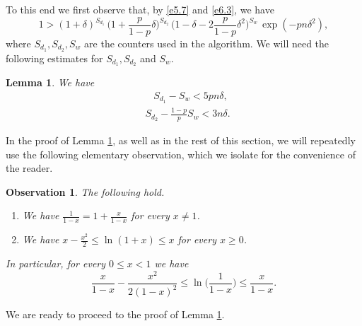 \documentclass[10pt]{amsart}
\newtheorem{lem}[thm]{Lemma}
\newtheorem{observation}[thm]{Observation}
\theoremstyle{remark}
\newcommand{\meg}{\geqslant}
\newcommand{\mik}{\leqslant}
\begin{document}
To this end we first observe that, by \eqref{e5.7} and \eqref{e6.3}, we have
\begin{equation} \label{e6.4}
1 >(1+\delta)^{S_{d_1}}\, \Big(1+\frac{p}{1-p}\delta\Big)^{S_{d_2}}\,
\Big(1-\delta-2\frac{p}{1-p}\delta^2\Big)^{S_w}\, \exp(-pn\delta^2),
\end{equation}
where $S_{d_1},S_{d_2},S_w$ are the counters used in the algorithm.
We will need the following estimates for $S_{d_1},S_{d_2}$ and $S_w$.
\begin{lem} \label{l6.1}
We have
\begin{align}
\label{e6.5} & \ \ \ \, S_{d_1}-S_w < 5pn\delta, \\
\label{e6.6} & S_{d_2} -\frac{1-p}{p}S_w  < 3n \delta.
\end{align}
\end{lem}
In the proof of Lemma \ref{l6.1}, as well as in the rest of this section, we will repeatedly use
the following elementary observation, which we isolate for the convenience of the reader.
\begin{observation} \label{o6.2}
The following hold.
\begin{enumerate}
\item[(i)] \label{i} We have $\frac{1}{1-x}=1+\frac{x}{1-x}$ for every $x\neq 1$.
\item[(ii)] \label{ii} We have $x-\frac{x^2}{2}\mik\ln(1+x)\mik x$ for every $x\meg 0$.
\end{enumerate}
In particular, for every $0\mik x <1$ we have
\begin{equation} \label{en.6.1}
\frac{x}{1-x} -\frac{x^2}{2(1-x)^2} \mik \ln\Big(\frac{1}{1-x}\Big) \mik \frac{x}{1-x}.
\end{equation}
\end{observation}
We are ready to proceed to the proof of Lemma \ref{l6.1}.
\end{document}
